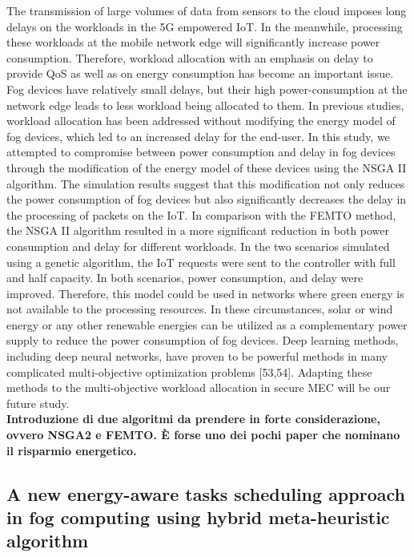 The transmission of large volumes of data from sensors to the cloud
imposes long delays on the workloads in the 5G empowered IoT. In
the meanwhile, processing these workloads at the mobile network edge
will significantly increase power consumption. Therefore, workload
allocation with an emphasis on delay to provide QoS as well as on
energy consumption has become an important issue. Fog devices have
relatively small delays, but their high power-consumption at the network edge leads to less workload being allocated to them. 
In previous studies, workload allocation has been addressed without modifying the
energy model of fog devices, which led to an increased delay for the
end-user. In this study, we attempted to compromise between power
consumption and delay in fog devices through the modification of the
energy model of these devices using the NSGA II algorithm. The simulation results suggest that this modification not only reduces the power
consumption of fog devices but also significantly decreases the delay in
the processing of packets on the IoT. In comparison with the FEMTO
method, the NSGA II algorithm resulted in a more significant reduction
in both power consumption and delay for different workloads. In the
two scenarios simulated using a genetic algorithm, the IoT requests
were sent to the controller with full and half capacity. In both scenarios,
power consumption, and delay were improved. Therefore, this model
could be used in networks where green energy is not available to the
processing resources. In these circumstances, solar or wind energy or
any other renewable energies can be utilized as a complementary power
supply to reduce the power consumption of fog devices.
Deep learning methods, including deep neural networks, have proven
to be powerful methods in many complicated multi-objective optimization problems [53,54]. Adapting these methods to the multi-objective
workload allocation in secure MEC will be our future study.\\

\textbf{Introduzione di due algoritmi da prendere in forte considerazione, ovvero NSGA2 e FEMTO. È forse uno dei pochi paper che nominano il risparmio energetico.}


\subsection{A new energy-aware tasks scheduling approach in fog computing using hybrid meta-heuristic algorithm}~\cite{hosseinioun2020new}

